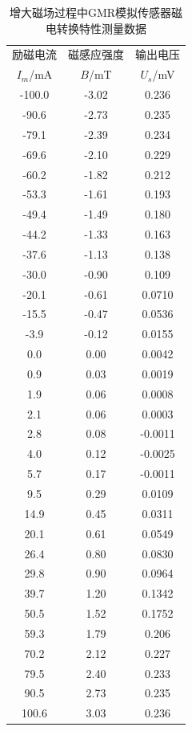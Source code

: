 \documentclass{thuemp}
\begin{document}
\begin{table}[H]
    \centering
    \captionnamefont{\wuhao\bf\heiti}
    \captiontitlefont{\wuhao\bf\heiti}
    \caption{增大磁场过程中GMR模拟传感器磁电转换特性测量数据} \label{tab:gmrsenso_incr}
    \liuhao
    \begin{tabular}{ccc}
        \toprule
        励磁电流 & 磁感应强度 & 输出电压  \\
        $I_m$/\si{\milli\ampere} & $B$/\si{\milli\tesla} & $U_s$/\si{\milli\volt} \\
        \midrule
        -100.0 & -3.02 & 0.236    \\
        -90.6  & -2.73 & 0.235    \\
        -79.1  & -2.39 & 0.234    \\
        -69.6  & -2.10 & 0.229    \\
        -60.2  & -1.82 & 0.212    \\
        -53.3  & -1.61 & 0.193    \\
        -49.4  & -1.49 & 0.180    \\
        -44.2  & -1.33 & 0.163    \\
        -37.6  & -1.13 & 0.138    \\
        -30.0  & -0.90 & 0.109    \\
        -20.1  & -0.61 & 0.0710   \\
        -15.5  & -0.47 & 0.0536   \\
        -3.9   & -0.12 & 0.0155   \\
        0.0    & 0.00  & 0.0042   \\
        0.9    & 0.03  & 0.0019   \\
        1.9    & 0.06  & 0.0008   \\
        2.1    & 0.06  & 0.0003   \\
        2.8    & 0.08  & -0.0011  \\
        4.0    & 0.12  & -0.0025  \\
        5.7    & 0.17  & -0.0011  \\
        9.5    & 0.29  & 0.0109   \\
        14.9   & 0.45  & 0.0311   \\
        20.1   & 0.61  & 0.0549   \\
        26.4   & 0.80  & 0.0830   \\
        29.8   & 0.90  & 0.0964   \\
        39.7   & 1.20  & 0.1342   \\
        50.5   & 1.52  & 0.1752   \\
        59.3   & 1.79  & 0.206    \\
        70.2   & 2.12  & 0.227    \\
        79.5   & 2.40  & 0.233    \\
        90.5   & 2.73  & 0.235    \\
        100.6  & 3.03  & 0.236    \\
        \bottomrule
    \end{tabular}
\end{table}
\end{document}
